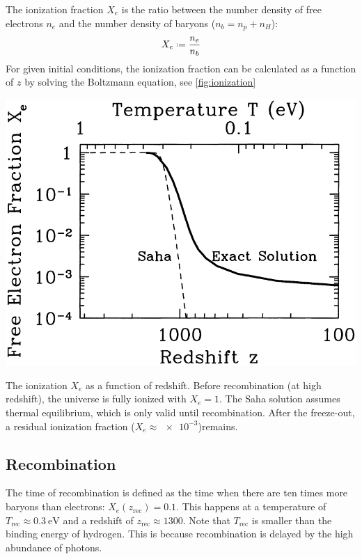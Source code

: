 The ionization fraction $X_e$ is the ratio between the number density of free electrons $n_e$ and the number density of baryons ($n_b = n_p + n_H$):
\begin{align*}
	X_e \defeq \frac{n_e}{n_b}
\end{align*}
For given initial conditions, the ionization fraction can be calculated as a function of $z$ by solving the Boltzmann equation, see \cref{fig:ionization}

\begin{marginfigure}
	\centering
	\includegraphics[width=\textwidth]{img/ch-02/ionization.png}
	\caption{The ionization $X_e$ as a function of redshift. Before recombination (at high redshift), the universe is fully ionized with $X_e=1$. The Saha solution assumes thermal equilibrium, which is only valid until recombination. After the freeze-out, a residual ionization fraction ($X_e \approx \num{e-3}$)remains.}
	\label{fig:ionization}
\end{marginfigure}

\subsection{Recombination}

The time of recombination is defined as the time when there are ten times more baryons than electrons: $X_e(z_\text{rec}) = 0.1$. This happens at a temperature of $T_\text{rec} \approx \SI{0.3}{\eV}$ and a redshift of $z_\text{rec} \approx 1300$. Note that $T_\text{rec}$ is smaller than the binding energy of hydrogen. This is because recombination is delayed by the high abundance of photons.

